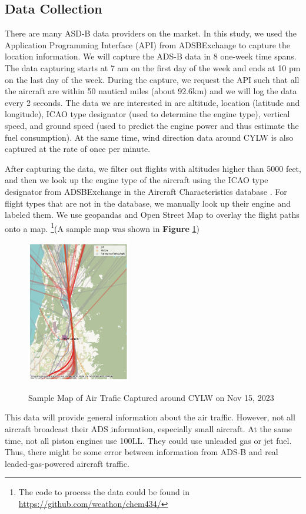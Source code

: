 \documentclass[12pt]{article}
\begin{document}
\subsection{Data Collection}
There are many ASD-B data providers on the market. In this study, we used the Application Programming Interface (API) from ADSBExchange \cite{adsbexchange} to capture the location information. We will capture the ADS-B data in 8 one-week time spans. The data capturing starts at 7 am on the first day of the week and ends at 10 pm on the last day of the week. During the capture, we request the API such that all the aircraft are within 50 nautical miles (about 92.6km) and we will log the data every 2 seconds. The data we are interested in are altitude, location (latitude and longitude), ICAO type designator (used to determine the engine type), vertical speed, and ground speed (used to predict the engine power and thus estimate the fuel consumption). At the same time, wind direction data around CYLW is also captured at the rate of once per minute. 

After capturing the data, we filter out flights with altitudes higher than 5000 feet, and then we look up the engine type of the aircraft using the ICAO type designator from ADSBExchange in the Aircraft Characteristics database \cite{faa}. For flight types that are not in the database, we manually look up their engine and labeled them. We use geopandas and Open Street Map \cite{OpenStreetMap} to overlay the flight paths onto a map. \footnote{The code to process the data could be found in \url{https://github.com/weathon/chem434/}}(A sample map was shown in \textbf{Figure} \ref{fig:map})

\setlength\intextsep{0pt}
\begin{figure}
  \begin{center}
    \includegraphics[width=0.4\textwidth]{download.png} \\
  \caption{Sample Map of Air Trafic Captured around CYLW on Nov 15, 2023}
      \label{fig:map}
  \end{center}
\end{figure}
This data will provide general information about the air traffic. However, not all aircraft broadcast their ADS information, especially small aircraft. At the same time, not all piston engines use 100LL. They could use unleaded gas or jet fuel. Thus, there might be some error between information from ADS-B and real leaded-gas-powered aircraft traffic. 
\end{document}
